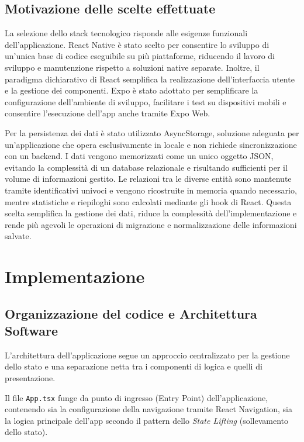 \documentclass[11pt,a4paper]{article}
\begin{document}
\subsection{ Motivazione delle scelte effettuate}

La selezione dello stack tecnologico risponde alle esigenze funzionali dell'applicazione. React Native è stato scelto per consentire lo sviluppo di un'unica base di codice eseguibile su più piattaforme, riducendo il lavoro di sviluppo e manutenzione rispetto a soluzioni native separate. Inoltre, il paradigma dichiarativo di React semplifica la realizzazione dell'interfaccia utente e la gestione dei componenti. Expo è stato adottato per semplificare la configurazione dell'ambiente di sviluppo, facilitare i test su dispositivi mobili e consentire l'esecuzione dell'app anche tramite Expo Web.

Per la persistenza dei dati è stato utilizzato AsyncStorage, soluzione adeguata per un'applicazione che opera esclusivamente in locale e non richiede sincronizzazione con un backend. I dati vengono memorizzati come un unico oggetto JSON, evitando la complessità di un database relazionale e risultando sufficienti per il volume di informazioni gestito. Le relazioni tra le diverse entità sono mantenute tramite identificativi univoci e vengono ricostruite in memoria quando necessario, mentre statistiche e riepiloghi sono calcolati mediante gli hook di React. Questa scelta semplifica la gestione dei dati, riduce la complessità dell'implementazione e rende più agevoli le operazioni di migrazione e normalizzazione delle informazioni salvate.




\section{Implementazione}

\subsection{Organizzazione del codice e Architettura Software}

L'architettura dell'applicazione segue un approccio centralizzato per la gestione dello stato e una separazione netta tra i componenti di logica e quelli di presentazione.

Il file \texttt{App.tsx} funge da punto di ingresso (Entry Point) dell'applicazione, contenendo sia la configurazione della navigazione tramite React Navigation, sia la logica principale dell'app secondo il pattern dello \textit{State Lifting} (sollevamento dello stato).
\end{document}
